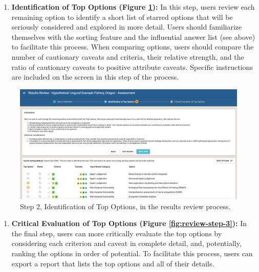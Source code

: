 \documentclass[
  11pt,
]{book}
\providecommand{\tightlist}{%
  \setlength{\itemsep}{0pt}\setlength{\parskip}{0pt}}
\begin{document}
\begin{enumerate}
\def\labelenumi{\arabic{enumi}.}
\setcounter{enumi}{1}
\tightlist
\item
  \textbf{Identification of Top Options (Figure \ref{fig:review-step-2}):} In this step, users review each remaining option to identify a short list of starred options that will be seriously considered and explored in more detail. Users should familiarize themselves with the sorting feature and the influential answer list (see above) to facilitate this process. When comparing options, users should compare the number of cautionary caveats and criteria, their relative strength, and the ratio of cautionary caveats to positive attribute caveats. Specific instructions are included on the screen in this step of the process.
\end{enumerate}

\begin{figure}

{\centering \includegraphics[width=0.95\linewidth]{images/review-step-2} 

}

\caption{Step 2, Identification of Top Options, in the results review process.}\label{fig:review-step-2}
\end{figure}

\begin{enumerate}
\def\labelenumi{\arabic{enumi}.}
\setcounter{enumi}{2}
\tightlist
\item
  \textbf{Critical Evaluation of Top Options (Figure \ref{fig:review-step-3}):} In the final step, users can more critically evaluate the top options by considering each criterion and caveat in complete detail, and, potentially, ranking the options in order of potential. To facilitate this process, users can export a report that lists the top options and all of their details.
\end{enumerate}
\end{document}
